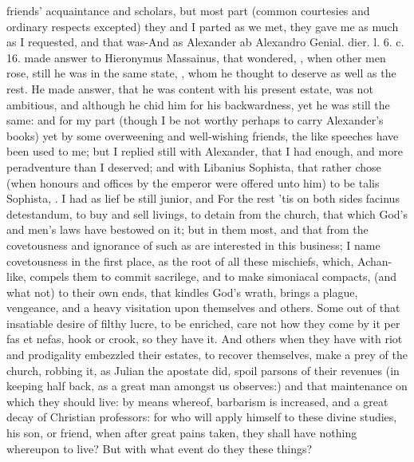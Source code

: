 {{friends' acquaintance and scholars, but most part (common courtesies
and ordinary respects excepted) they and I parted as we met, they gave
me as much as I requested, and that was-And as Alexander ab Alexandro
Genial. dier. l. 6. c. 16. made answer to Hieronymus Massainus, that
wondered, , when other men rose, still he was in the
same state, , whom he thought to deserve as well as the rest. He made
answer, that he was content with his present estate, was not ambitious,
and although  he chid him
for his backwardness, yet he was still the same: and for my part
(though I be not worthy perhaps to carry Alexander's books) yet by some
overweening and well-wishing friends, the like speeches have been used
to me; but I replied still with Alexander, that I had enough, and more
peradventure than I deserved; and with Libanius Sophista, that rather
chose (when honours and offices by the emperor were offered unto him)
to be talis Sophista, . I had as lief be still
\Democritus{} junior, and  For the rest
'tis on both sides facinus detestandum, to buy and sell livings, to
detain from the church, that which God's and men's laws have bestowed
on it; but in them most, and that from the covetousness and ignorance
of such as are interested in this business; I name covetousness in the
first place, as the root of all these mischiefs, which, Achan-like,
compels them to commit sacrilege, and to make simoniacal compacts, (and
what not) to their own ends, that kindles God's wrath, brings a
plague, vengeance, and a heavy visitation upon themselves and others.
Some out of that insatiable desire of filthy lucre, to be enriched,
care not how they come by it per fas et nefas, hook or crook, so they
have it. And others when they have with riot and prodigality embezzled
their estates, to recover themselves, make a prey of the church,
robbing it, as Julian the apostate did, spoil parsons of their
revenues (in keeping half back, as a great man amongst us
observes:) and that maintenance on which they should live: by means
whereof, barbarism is increased, and a great decay of Christian
professors: for who will apply himself to these divine studies, his
son, or friend, when after great pains taken, they shall have nothing
whereupon to live? But with what event do they these things?

}}
